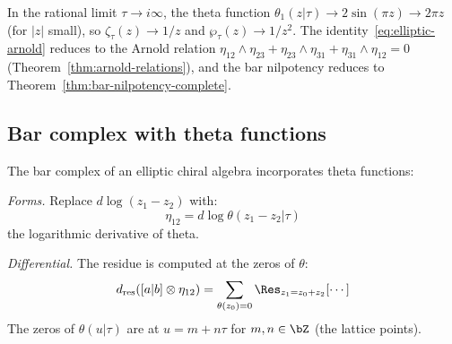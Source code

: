 \begin{remark}\label{rem:fay-to-arnold}
In the rational limit $\tau \to i\infty$, the theta function
$\theta_1(z|\tau) \to 2\sin(\pi z) \to 2\pi z$ (for $|z|$ small),
so $\zeta_\tau(z) \to 1/z$ and $\wp_\tau(z) \to 1/z^2$.
The identity~\eqref{eq:elliptic-arnold} reduces to the Arnold relation
$\eta_{12} \wedge \eta_{23} + \eta_{23} \wedge \eta_{31} +
\eta_{31} \wedge \eta_{12} = 0$
(Theorem~\ref{thm:arnold-relations}), and the
bar nilpotency reduces to
Theorem~\ref{thm:bar-nilpotency-complete}.
\end{remark}


\subsection{Bar complex with theta functions}

\begin{construction}\label{constr:elliptic-bar}
The bar complex of an elliptic chiral algebra incorporates theta functions:

\emph{Forms.} Replace $d\log(z_1 - z_2)$ with:
\[
\eta_{12} = d\log\theta(z_1 - z_2 | \tau)
\]
the logarithmic derivative of theta.

\emph{Differential.} The residue is computed at the zeros of $\theta$:
\[
d_{\text{res}}([a|b] \otimes \eta_{12}) = \sum_{\theta(z_0) = 0} \Res_{z_1 = z_0 + z_2}[\cdots]
\]
The zeros of $\theta(u|\tau)$ are at $u = m + n\tau$ for $m, n \in \bZ$ (the lattice points).
\end{construction}

